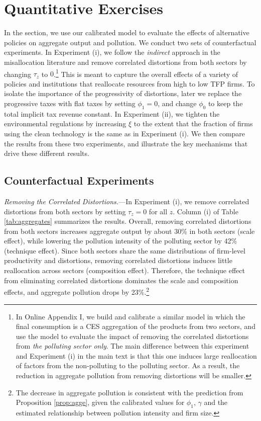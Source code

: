 \documentclass[AEJ]{AEA}
\begin{document}
\section{Quantitative Exercises}

In the section, we use our calibrated model to evaluate the effects of alternative policies on aggregate output and pollution. We conduct two sets of counterfactual experiments.  In Experiment (i), we follow the \emph{indirect} approach in the misallocation literature and remove correlated distortions from both sectors by changing $\tau_z$ to $0$.\footnote{In Online Appendix I, we build and calibrate a similar model in which the final consumption is a CES aggregation of the products from two sectors, and use the model to evaluate the impact of removing the correlated distortions from \emph{the polluting sector only}. The main difference between this experiment and Experiment (i) in the main text is that this one induces large reallocation of factors from the non-polluting to the polluting sector. As a result, the reduction in aggregate pollution from removing distortions will be smaller. } This is meant to capture the overall effects of a variety of policies and institutions that reallocate resources from high to low TFP firms. To isolate the importance of the {progressivity} of distortions, later we replace the progressive taxes with flat taxes by setting $\phi_1=0$, and change $\phi_0$ to keep the total implicit tax revenue constant. In Experiment (ii), we tighten the environmental regulations by increasing $\xi$ to the extent that the fraction of firms using the clean technology is the same as in Experiment (i). We then compare the results from these two experiments, and illustrate the key mechanisms that drive these different results.

\subsection{Counterfactual Experiments}

\textit{Removing the Correlated Distortions.}---In Experiment (i), we remove correlated distortions from both sectors by setting $\tau_z = 0$ for all $z$. Column (i) of Table \ref{tab:aggregates} summarizes the results. Overall, removing correlated distortions from both sectors increases aggregate output by about 30\% in both sectors (scale effect), while lowering the pollution intensity of the polluting sector by 42\% (technique effect). Since both sectors share the same distributions of firm-level productivity and distortions, removing correlated distortions induces little reallocation across sectors (composition effect). Therefore, the technique effect from eliminating correlated distortions dominates the scale and composition effects, and aggregate pollution drops by 23\%.\footnote{The decrease in aggregate pollution is consistent with the prediction from Proposition \ref{prop:agge}, given the calibrated values for $\phi_1$, $\gamma$ and the estimated relationship between pollution intensity and firm size.}
\end{document}
